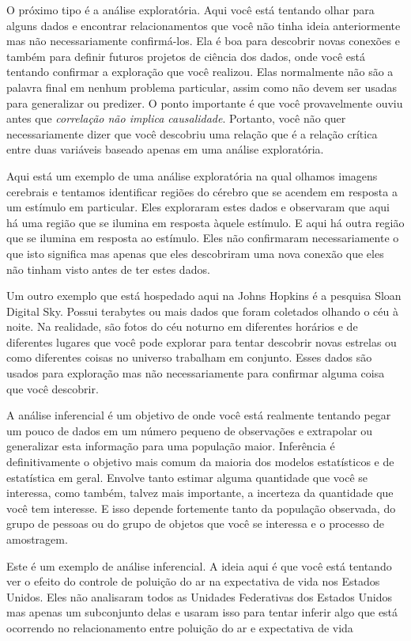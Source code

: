 \begin{multicols}{2}
\begin{footnotesize}
O próximo tipo é a análise exploratória. Aqui você está tentando olhar para alguns dados e encontrar relacionamentos que você não tinha ideia anteriormente mas não necessariamente confirmá-los. Ela é boa para descobrir novas conexões e também para definir futuros projetos de ciência dos dados, onde você está tentando confirmar a exploração que você realizou. Elas normalmente não são a palavra final em nenhum problema particular, assim como não devem ser usadas para generalizar ou predizer.
O ponto importante é que você provavelmente ouviu antes que \emph{correlação não implica causalidade}. Portanto, você não quer necessariamente dizer que você descobriu uma relação que é a relação crítica entre duas variáveis baseado apenas em uma análise exploratória.

Aqui está um exemplo de uma análise exploratória na qual olhamos imagens cerebrais e tentamos identificar regiões do cérebro que se acendem em resposta a um estímulo em particular. Eles exploraram estes dados e observaram que aqui há uma região que se ilumina em resposta àquele estímulo. E aqui há outra região que se ilumina em resposta ao estímulo. Eles não confirmaram necessariamente o que isto significa mas apenas que eles descobriram uma nova conexão que eles não tinham visto antes de ter estes dados.

Um outro exemplo que está hospedado aqui na Johns Hopkins é a pesquisa Sloan Digital Sky. Possui terabytes ou mais dados que foram coletados olhando o céu à noite. Na realidade, são fotos do céu noturno em diferentes horários e de diferentes lugares que você pode explorar para tentar descobrir novas estrelas ou como diferentes coisas no universo trabalham em conjunto. Esses dados são usados para exploração mas não necessariamente para confirmar alguma coisa que você descobrir.

A análise inferencial é um objetivo de onde você está realmente tentando pegar um pouco de dados em um número pequeno de observações e extrapolar ou generalizar esta informação para uma população maior. Inferência é definitivamente o objetivo mais comum da maioria dos modelos estatísticos e de estatística em geral. Envolve tanto estimar alguma quantidade que você se interessa, como também, talvez mais importante, a incerteza da quantidade que você tem interesse. E isso depende fortemente tanto da população observada, do grupo de pessoas  ou do grupo de objetos que você se interessa e o processo de amostragem.

Este é um exemplo de análise inferencial. A ideia aqui é que você está tentando ver o efeito do controle de poluição do ar na expectativa de vida nos Estados Unidos. Eles não analisaram todos as Unidades Federativas dos Estados Unidos mas apenas um subconjunto delas e usaram isso para tentar inferir algo que está ocorrendo no relacionamento entre poluição do ar e expectativa de vida 


\end{footnotesize}
\end{multicols}
